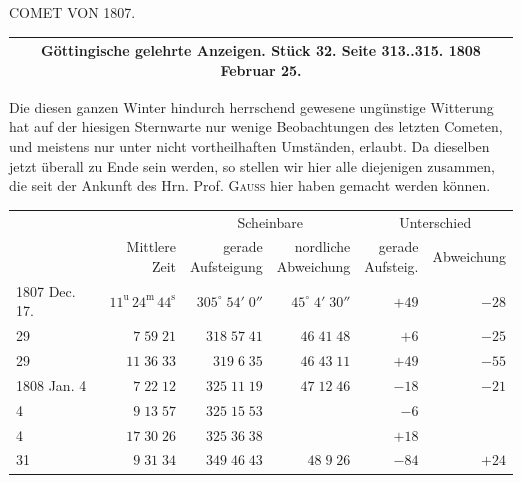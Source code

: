 \par{}

\begin{center}
COMET VON 1807.
\end{center}

\begin{center}
\fontsize{10}{12}\selectfont\begin{tabular}{c}
\hline
Göttingische gelehrte Anzeigen. Stück 32. Seite 313..315. 1808 Februar 25. \\
\hline
\end{tabular}
\end{center}

Die diesen ganzen Winter hindurch herrschend gewesene ungünstige Witterung hat auf der hiesigen
Sternwarte nur wenige Beobachtungen des letzten Cometen, und meistens nur unter nicht
vortheilhaften Umständen, erlaubt. Da dieselben jetzt überall zu Ende sein werden, so stellen wir
hier alle diejenigen zusammen, die seit der Ankunft des Hrn. Prof. \textsc{Gauss} hier haben
gemacht werden können.


\begin{center}\fontsize{9}{11}\selectfont\setlength{\tabcolsep}{2pt}\renewcommand{\arraystretch}{1.15}\begin{tabular}{lrrrrr}
& & \multicolumn{2}{c}{Scheinbare} & \multicolumn{2}{c}{Unterschied}\\
& Mittlere Zeit & \shortstack{gerade\\Aufsteigung} & \shortstack{nordliche\\Abweichung} & \shortstack{gerade\\Aufsteig.} & Abweichung\\\hline
1807 Dec. 17. & $11^{\text{u}}\,24^{\text{m}}\,44^{\text{s}}$ & $305^\circ\;54'\;0''$ & $45^\circ\;4'\;30''$ & $+49$ & $-28$\\
29 & $7\;59\;21$ & $318\;57\;41$ & $46\;41\;48$ & $+6$ & $-25$\\
29 & $11\;36\;33$ & $319\;6\;35$ & $46\;43\;11$ & $+49$ & $-55$\\
1808 Jan. 4 & $7\;22\;12$ & $325\;11\;19$ & $47\;12\;46$ & $-18$ & $-21$\\
4 & $9\;13\;57$ & $325\;15\;53$ & & $-6$ & \\
4 & $17\;30\;26$ & $325\;36\;38$ & & $+18$ & \\
31 & $9\;31\;34$ & $349\;46\;43$ & $48\;9\;26$ & $-84$ & $+24$\\
\end{tabular}\end{center}

